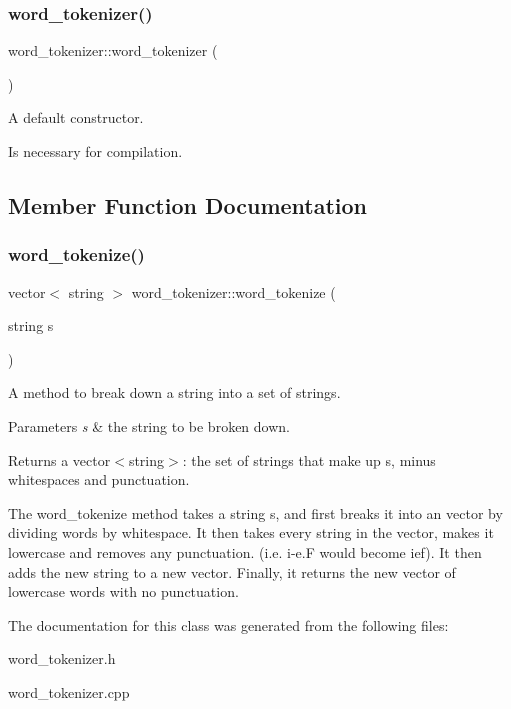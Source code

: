 \subsubsection{\texorpdfstring{word\+\_\+tokenizer()}{word\_tokenizer()}}
{\footnotesize\ttfamily word\+\_\+tokenizer\+::word\+\_\+tokenizer (\begin{DoxyParamCaption}{ }\end{DoxyParamCaption})}



A default constructor. 

Is necessary for compilation. 

\subsection{Member Function Documentation}
\mbox{\label{classword__tokenizer_a4a77b2c08a636c15935a5c9dbd0d1d4f}} 
\subsubsection{\texorpdfstring{word\+\_\+tokenize()}{word\_tokenize()}}
{\footnotesize\ttfamily vector$<$ string $>$ word\+\_\+tokenizer\+::word\+\_\+tokenize (\begin{DoxyParamCaption}\item[{string}]{s }\end{DoxyParamCaption})}



A method to break down a string into a set of strings. 


\begin{DoxyParams}{Parameters}
{\em s} & the string to be broken down. \\
\hline
\end{DoxyParams}
\begin{DoxyReturn}{Returns}
a vector$<$string$>$\+: the set of strings that make up s, minus whitespaces and punctuation.
\end{DoxyReturn}
The word\+\_\+tokenize method takes a string s, and first breaks it into an vector by dividing words by whitespace. It then takes every string in the vector, makes it lowercase and removes any punctuation. (i.\+e. \textquotesingle{}i-\/e.\+F\textquotesingle{} would become \textquotesingle{}ief\textquotesingle{}). It then adds the new string to a new vector. Finally, it returns the new vector of lowercase words with no punctuation. 

The documentation for this class was generated from the following files\+:\begin{DoxyCompactItemize}
\item 
word\+\_\+tokenizer.\+h\item 
word\+\_\+tokenizer.\+cpp\end{DoxyCompactItemize}
